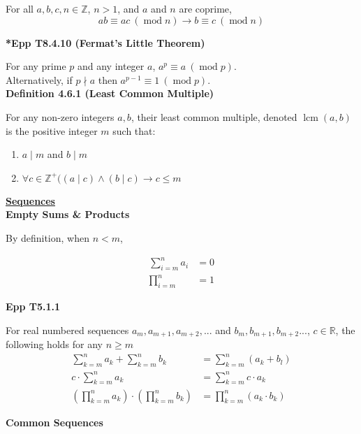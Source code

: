 \documentclass[a4paper]{article}
\newcommand{\heading}[1]{{\small\underline{\textbf{#1}}}}
\newcommand{\subheading}[1]{{\scriptsize\textbf{#1}}}
\newcommand\divides{\;|\;}
\newcommand\undermod[1]{\ (\operatorname{mod}#1)}
\DeclareMathOperator\lcm{lcm}
\begin{document}
\begin{multicols*}{4}
For all $a, b, c, n \in \mathbb{Z}$, $n>1$, and $a$ and $n$ are coprime,
$$ ab \equiv ac \undermod{n} \rightarrow b \equiv c \undermod{n} $$

\subheading{*Epp T8.4.10 (Fermat's Little Theorem)}

For any prime $p$ and any integer $a$, $a^p \equiv a \undermod{p}$.\\

Alternatively, if $p \nmid a$ then $a^{p-1} \equiv 1 \undermod{p}$.\\

\subheading{Definition 4.6.1 (Least Common Multiple)}

For any non-zero integers $a, b$, their least common multiple, denoted
$\lcm(a,b)$ is the positive integer $m$ such that:
\begin{enumerate} \itemsep -0.5em
  \item $a \divides m$ and $b \divides m$
  \item $\forall c \in \mathbb{Z}^+ ((a \divides c) \land (b \divides c)
    \rightarrow c \leq m$
\end{enumerate}

\heading{Sequences}\\

\subheading{Empty Sums \& Products}

By definition, when $n < m$,

\begin{align*}
\sum^n_{i=m} a_i &= 0 \\
\prod^n_{i=m} &= 1
\end{align*}

\subheading{Epp T5.1.1}

For real numbered sequences $a_m, a_{m+1}, a_{m+2}, ...$ and $b_m, b_{m+1},
b_{m+2}...$, $c \in \mathbb{R}$, the following holds for any $n \geq m$
\begin{align*}
\sum^n_{k=m} a_k + \sum^n_{k=m} b_k &= \sum^n_{k=m}(a_k + b_l) \\
c \cdot \sum^n_{k=m} a_k &= \sum^n_{k=m} c \cdot a_k\\
\left ( \prod^n_{k=m} a_k \right ) \cdot \left ( \prod^n_{k=m} b_k \right ) &=
  \prod^n_{k=m}(a_k \cdot b_k)
\end{align*}

\vspace{0.3cm}

\subheading{Common Sequences}\\


\end{multicols*}
\end{document}
